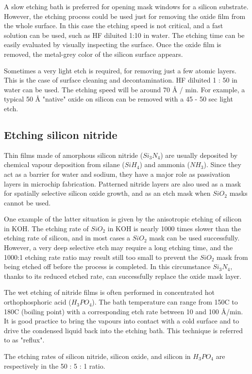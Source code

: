A slow etching bath is preferred for opening mask windows for a silicon substrate.
However, the etching process could be used just for removing the oxide film from the whole surface.
In this case the etching speed is not critical, and a fast solution can be used, such as HF diluited 1:10 in water.
The etching time can be easily evaluated by visually inspecting the surface.
Once the oxide film is removed, the metal-grey color of the silicon surface appears.

Sometimes a very light etch is required, for removing just a few atomic layers.
This is the case of surface cleaning and decontamination. HF diluited 1 : 50 in water can be used.
The etching speed will be around 70 Å / min. For example, a typical 50 Å "native" oxide on silicon can be removed with a 45 - 50 sec light etch.

\newpage

\subsection{Etching silicon nitride}
Thin films made of amorphous silicon nitride ($Si_3N_4$) are usually deposited by chemical vapour deposition from silane ($SiH_4$) and ammonia ($NH_3$).
Since they act as a barrier for water and sodium, they have a major role as passivation layers in microchip fabrication.
Patterned nitride layers are also used as a mask for spatially selective silicon oxide growth, and as an etch mask when $SiO_2$ masks cannot be used.

One example of the latter situation is given by the anisotropic etching of silicon in KOH.
The etching rate of $SiO_2$ in KOH is nearly 1000 times slower than the etching rate of silicon, and in most cases a $SiO_2$ mask can be used successfully.
However, a very deep selective etch may require a long etching time, and the 1000:1 etching rate ratio may result still too small to prevent the $SiO_2$ mask from being etched off before the process is completed.
In this circumstance $Si_3N_4$, thanks to its reduced etched rate, can successfully replace the oxide mask layer.

The wet etching of nitride films is often performed in concentrated hot orthophosphoric acid ($H_3PO_4$).
The bath temperature can range from 150\degree C to 180\degree C (boiling point) with a corresponding etch rate between 10 and 100 Å/min.
It is good practice to bring the vapours into contact with a cold surface and to drive the condensed liquid back into the etching bath.
This technique is referred to as "reflux".

The etching rates of silicon nitride, silicon oxide, and silicon in $H_3PO_4$ are respectively in the 50 : 5 : 1 ratio.